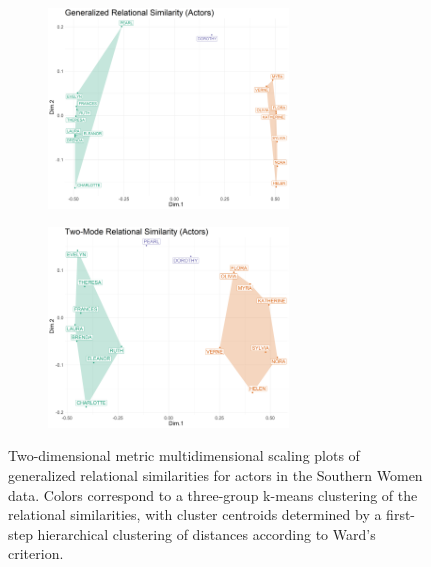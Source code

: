 \documentclass[a4paper,fleqn]{cas-sc}
\begin{document}
\begin{figure}[ht!]
     \begin{subfigure}[b]{1.0\textwidth}
        \centering
        \includegraphics[width=0.7\textwidth]{Plots/grs-actors.png}
        \caption{}
        \label{fig:grm-actors}
    \end{subfigure} 
     \begin{subfigure}[b]{1.0\textwidth}
        \centering
        \includegraphics[width=0.7\textwidth]{Plots/tmrs-actors.png}
        \caption{}
        \label{fig:tmrs-actors}
    \end{subfigure} 
    \caption{Two-dimensional metric multidimensional scaling plots of generalized relational similarities for actors in the Southern Women data. Colors correspond to a three-group k-means clustering of the relational similarities, with cluster centroids determined by a first-step hierarchical clustering of distances according to Ward's \citeyearpar{ward63} criterion.}
    \label{fig:actors}
 \end{figure}
\end{document}
